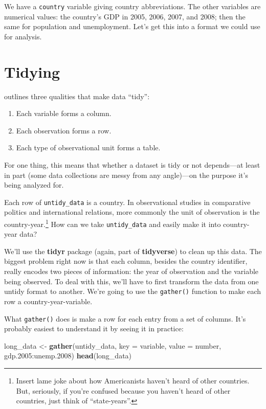 \documentclass[12pt,oneside,openany]{tufte-book}
\newenvironment{Shaded}{}{}
\newcommand{\KeywordTok}[1]{\textcolor[rgb]{0.00,0.44,0.13}{\textbf{{#1}}}}
\newcommand{\DataTypeTok}[1]{\textcolor[rgb]{0.56,0.13,0.00}{{#1}}}
\newcommand{\FloatTok}[1]{\textcolor[rgb]{0.25,0.63,0.44}{{#1}}}
\newcommand{\StringTok}[1]{\textcolor[rgb]{0.25,0.44,0.63}{{#1}}}
\newcommand{\NormalTok}[1]{{#1}}
\providecommand{\tightlist}{%
  \setlength{\itemsep}{0pt}\setlength{\parskip}{0pt}}
\begin{document}
We have a \texttt{country} variable giving country abbreviations. The
other variables are numerical values: the country's GDP in 2005, 2006,
2007, and 2008; then the same for population and unemployment. Let's get
this into a format we could use for analysis.

\section{Tidying}\label{tidying}

\citet{Wickham:2014vp} outlines three qualities that make data ``tidy'':

\begin{enumerate}
\def\labelenumi{\arabic{enumi}.}
\tightlist
\item
  Each variable forms a column.
\item
  Each observation forms a row.
\item
  Each type of observational unit forms a table.
\end{enumerate}

For one thing, this means that whether a dataset is tidy or not
depends---at least in part (some data collections are messy from any
angle)---on the purpose it's being analyzed for.

Each row of \texttt{untidy\_data} is a country. In observational studies
in comparative politics and international relations, more commonly the
unit of observation is the country-year.\footnote{Insert lame joke about
  how Americanists haven't heard of other countries. But, seriously, if
  you're confused because you haven't heard of other countries, just
  think of ``state-years''.} How can we take \texttt{untidy\_data} and
easily make it into country-year data?

We'll use the \textbf{tidyr} package (again, part of \textbf{tidyverse})
to clean up this data. The biggest problem right now is that each
column, besides the country identifier, really encodes two pieces of
information: the year of observation and the variable being observed. To
deal with this, we'll have to first transform the data from one untidy
format to another. We're going to use the \texttt{gather()} function to
make each row a country-year-variable.

What \texttt{gather()} does is make a row for each entry from a set of
columns. It's probably easiest to understand it by seeing it in
practice:

\begin{Shaded}
\begin{Highlighting}[]
\NormalTok{long_data <-}\StringTok{ }\KeywordTok{gather}\NormalTok{(untidy_data, }\DataTypeTok{key =} \NormalTok{variable, }
    \DataTypeTok{value =} \NormalTok{number, gdp}\FloatTok{.2005}\NormalTok{:unemp}\FloatTok{.2008}\NormalTok{)}
\KeywordTok{head}\NormalTok{(long_data)}
\end{Highlighting}
\end{Shaded}
\end{document}
